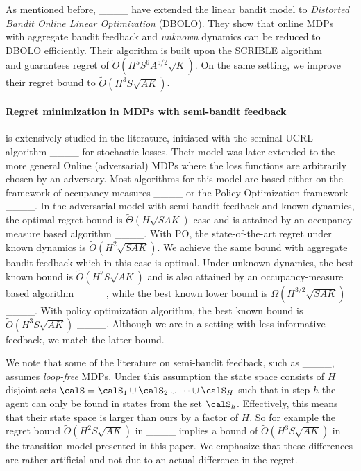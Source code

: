 As mentioned before, ____ have extended the linear bandit model to \textit{Distorted Bandit Online Linear Optimization} (DBOLO). They show that online MDPs with aggregate bandit feedback and \textit{unknown} dynamics can be reduced to DBOLO efficiently. Their algorithm is built upon the SCRIBLE algorithm ____ and guarantees regret of $\tilde O(H^5 S^6 A^{5/2} \sqrt{K})$. On the same setting, we improve their regret bound to $\tilde O(H^3 S \sqrt{A K})$.
\paragraph{\bf Regret minimization in MDPs with semi-bandit feedback\hspace{-0.5em}} is extensively studied in the literature, initiated with the seminal UCRL algorithm ____ for stochastic losses. Their model was later extended to the more general Online (adversarial) MDPs where the loss functions are arbitrarily chosen by an adversary. Most algorithms for this model are based either on the framework of occupancy measures  ____ or the Policy Optimization framework ____. In the adversarial model with semi-bandit feedback and known dynamics, the optimal regret bound is $\tilde \Theta (H\sqrt{S A K})$ case and is attained by an occupancy-measure based algorithm ____. With PO, the state-of-the-art regret under known dynamics is $\tilde O (H^{2}\sqrt{S A K})$. We achieve the same bound with aggregate bandit feedback which in this case is optimal. 
Under unknown dynamics, the best known bound is $\tilde O (H^{2} S\sqrt{A K})$ and is also attained by an occupancy-measure based algorithm ____, while the best known lower bound is $\Omega(H^{3/2} \sqrt{S A K})$ ____. With policy optimization algorithm, the best known bound is $\tilde O (H^{3} S\sqrt{A K})$ ____. Although we are in a setting with less informative feedback, we match the latter bound.
% 

\begin{remark}
    \label{remark:loop-free}
    We note that some of the literature on semi-bandit feedback, such as ____, assumes \textit{loop-free} MDPs. Under this assumption the state space consists of $H$ disjoint sets $\calS = \calS_1 \cup \calS_2 \cup \dots \cup \calS_H$ such that in step $h$ the agent can only be found in states from the set $\calS_h$.
    Effectively, this means that their state space is larger than ours by a factor of $H$.
    So for example the regret bound $\tilde O(H^2 S \sqrt{A K})$ in ____ implies a bound of $\tilde O(H^3 S \sqrt{A K})$ in the transition model presented in this paper.
    We emphasize that these differences are rather artificial and not due to an actual difference in the regret.
\end{remark}



